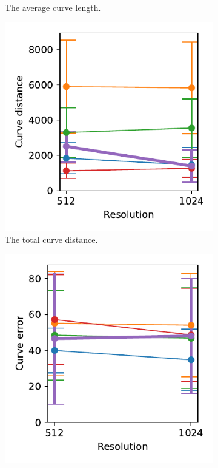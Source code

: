 \begin{figure}[h]
\begin{subfigure}{.3\textwidth}
    \caption{The average curve length.}
\end{subfigure}
    \begin{subfigure}{.3\textwidth}
    \centering
    \includegraphics[width=\textwidth]{graphics/eval/curve distance_1024-1.024_True_sketchbench.pdf}
    \caption{The total curve distance.}
\end{subfigure}
    \begin{subfigure}{.3\textwidth}
    \centering
    \includegraphics[width=\textwidth]{graphics/eval/curve error_1024-1.024_True_sketchbench.pdf}

\end{subfigure}
\end{figure}
